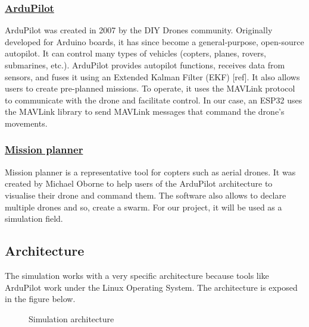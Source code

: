 \subsubsection{\href{https://github.com/ArduPilot/ardupilot}{ArduPilot}}

 ArduPilot was created in 2007 by the DIY Drones community. Originally developed for Arduino boards, it has since become a general-purpose, open-source autopilot. It can control many types of vehicles (copters, planes, rovers, submarines, etc.). ArduPilot provides autopilot functions, receives data from sensors, and fuses it using an Extended Kalman Filter (EKF) [ref]. It also allows users to create pre-planned missions. To operate, it uses the MAVLink protocol to communicate with the drone and facilitate control. In our case, an ESP32 uses the MAVLink library to send MAVLink messages that command the drone’s movements.

\subsubsection{\href{https://ardupilot.org/planner/}{Mission planner}}

Mission planner is a representative tool for copters such as aerial drones. It was created by Michael Oborne to help users of the ArduPilot architecture to visualise their drone and command them. The software also allows to declare multiple drones and so, create a swarm. For our project, it will be used as a simulation field. 
\newpage
\subsection{Architecture}

The simulation works with a very specific architecture because tools like ArduPilot work under the Linux Operating System. The architecture is exposed in the figure below. 

\begin{figure}[H]
  \centering
   \resizebox{0.9\textwidth}{!}{\SchSimulation}
  \caption{Simulation architecture}
\end{figure}


